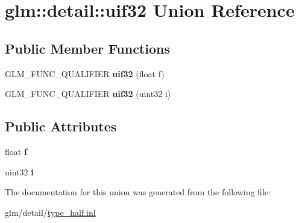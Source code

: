\hypertarget{unionglm_1_1detail_1_1uif32}{\section{glm\-:\-:detail\-:\-:uif32 Union Reference}
\label{unionglm_1_1detail_1_1uif32}
}
\subsection*{Public Member Functions}
\begin{DoxyCompactItemize}
\item 
\hypertarget{unionglm_1_1detail_1_1uif32_ae86c2bd42a88f11e3217d14e46606971}{G\-L\-M\-\_\-\-F\-U\-N\-C\-\_\-\-Q\-U\-A\-L\-I\-F\-I\-E\-R {\bfseries uif32} (float f)}\label{unionglm_1_1detail_1_1uif32_ae86c2bd42a88f11e3217d14e46606971}

\item 
\hypertarget{unionglm_1_1detail_1_1uif32_a3d5981678c930776894daf8e94295fe2}{G\-L\-M\-\_\-\-F\-U\-N\-C\-\_\-\-Q\-U\-A\-L\-I\-F\-I\-E\-R {\bfseries uif32} (uint32 i)}\label{unionglm_1_1detail_1_1uif32_a3d5981678c930776894daf8e94295fe2}

\end{DoxyCompactItemize}
\subsection*{Public Attributes}
\begin{DoxyCompactItemize}
\item 
\hypertarget{unionglm_1_1detail_1_1uif32_a5f697f84c5a8ec72c2f3a4f705f5bde8}{float {\bfseries f}}\label{unionglm_1_1detail_1_1uif32_a5f697f84c5a8ec72c2f3a4f705f5bde8}

\item 
\hypertarget{unionglm_1_1detail_1_1uif32_a981c1c59e160db23c73908cd7e629229}{uint32 {\bfseries i}}\label{unionglm_1_1detail_1_1uif32_a981c1c59e160db23c73908cd7e629229}

\end{DoxyCompactItemize}


The documentation for this union was generated from the following file\-:\begin{DoxyCompactItemize}
\item 
glm/detail/\hyperlink{type__half_8inl}{type\-\_\-half.\-inl}\end{DoxyCompactItemize}

